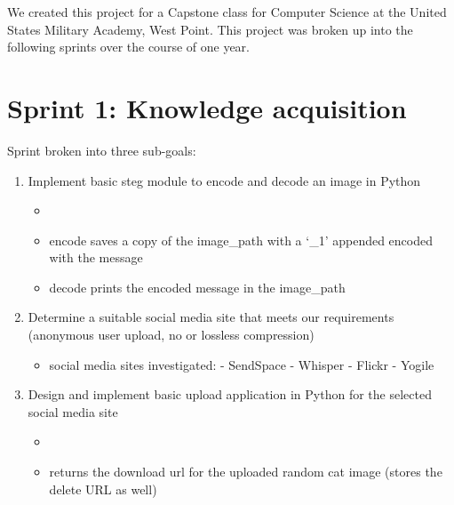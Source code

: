 \documentclass[letterpaper,12pt,openany,oneside]{sphinxmanual}
\begin{document}
We created this project for a Capstone class for Computer Science at the United States Military Academy, West Point. This project was broken up into the following sprints over the course of one year.


\section{Sprint 1: Knowledge acquisition}
\label{index:sprint-1-knowledge-acquisition}
Sprint broken into three sub-goals:
\begin{enumerate}
\item {} 
Implement basic steg module to encode and decode an image in Python
\begin{itemize}
\item {} 

\item {} 
encode saves a copy of the image\_path with a `\_1' appended encoded with the message

\item {} 
decode prints the encoded message in the image\_path

\end{itemize}

\item {} 
Determine a suitable social media site that meets our requirements (anonymous user upload, no or lossless compression)
\begin{itemize}
\item {} 
social media sites investigated:
- SendSpace
- Whisper
- Flickr
- Yogile

\end{itemize}

\item {} 
Design and implement basic upload application in Python for the selected social media site
\begin{itemize}
\item {} 

\item {} 
returns the download url for the uploaded random cat image (stores the delete URL as well)

\end{itemize}

\end{enumerate}
\end{document}
